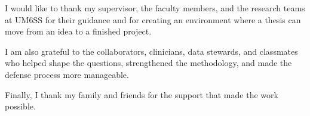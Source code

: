 I would like to thank my supervisor, the faculty members, and the research teams at UM6SS for their guidance and for creating an environment where a thesis can move from an idea to a finished project.

I am also grateful to the collaborators, clinicians, data stewards, and classmates who helped shape the questions, strengthened the methodology, and made the defense process more manageable.

Finally, I thank my family and friends for the support that made the work possible.
